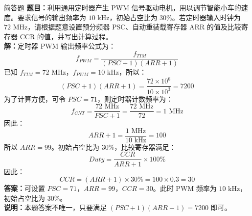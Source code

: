 \documentclass[UTF8,fontset=none,12pt]{ctexart}
\begin{document}
\begin{summarybox}{简答题}
\textbf{题目：}利用通用定时器产生 PWM 信号驱动电机，用以调节智能小车的速度。要求信号的输出频率为 $10\text{ kHz}$，初始占空比为 $30\%$。若定时器输入时钟为 $72\text{ MHz}$，请根据题意设置预分频器 PSC、自动重装载寄存器 ARR 的值及比较寄存器 CCR 的值，并写出计算过程。\\[0.6em]
\textbf{解：}定时器 PWM 输出频率公式为：
\[
  f_{PWM}=\frac{f_{TIM}}{(PSC+1)(ARR+1)}
\]
已知 $f_{TIM}=72\text{ MHz}$，$f_{PWM}=10\text{ kHz}$，所以：
\[
  (PSC+1)(ARR+1)=\frac{72\times 10^6}{10\times 10^3}=7200
\]
为了计算方便，可令 $PSC=71$，则定时器计数频率为：
\[
  f_{CNT}=\frac{72\text{ MHz}}{PSC+1}=\frac{72\text{ MHz}}{72}=1\text{ MHz}
\]
因此：
\[
  ARR+1=\frac{1\text{ MHz}}{10\text{ kHz}}=100
\]
所以 $ARR=99$。初始占空比为 $30\%$，比较寄存器满足：
\[
  Duty=\frac{CCR}{ARR+1}\times 100\%
\]
因此：
\[
  CCR=(ARR+1)\times 30\%=100\times 0.3=30
\]
\textbf{答案：}可设置 $PSC=71$，$ARR=99$，$CCR=30$。此时 PWM 频率为 $10\text{ kHz}$，初始占空比为 $30\%$。\\[0.6em]
\textbf{说明：}本题答案不唯一，只要满足 $(PSC+1)(ARR+1)=7200$ 即可。
\end{summarybox}
\end{document}
